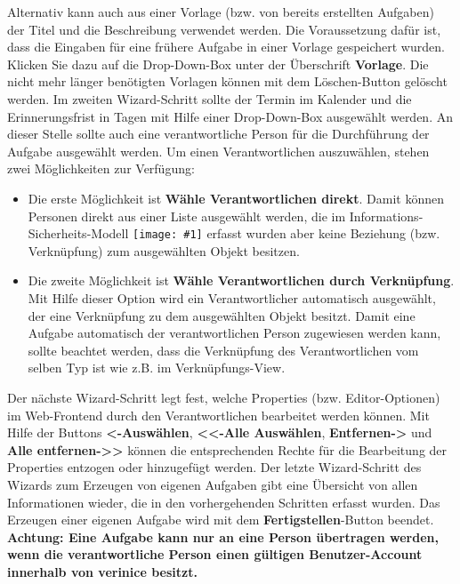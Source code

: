 \documentclass[a4paper,10pt]{book}
\newcommand{\icon}[1]{\texttt{[image: \#1]}}
\begin{document}
Alternativ kann auch aus einer Vorlage (bzw. von bereits erstellten Aufgaben) der Titel und die
Beschreibung verwendet werden. Die Voraussetzung dafür ist, dass die Eingaben für eine frühere Aufgabe in einer Vorlage gespeichert wurden.
Klicken Sie dazu auf die Drop-Down-Box unter der Überschrift \textbf{Vorlage}.
Die nicht mehr länger benötigten Vorlagen können mit dem Löschen-Button gelöscht werden.
Im zweiten Wizard-Schritt sollte der Termin im Kalender und die Erinnerungsfrist in Tagen mit Hilfe einer Drop-Down-Box ausgewählt werden.
An dieser Stelle sollte auch eine verantwortliche Person
für die Durchführung der Aufgabe ausgewählt werden. Um einen Verantwortlichen auszuwählen, stehen zwei Möglichkeiten zur Verfügung:
\begin{itemize}
 \item Die erste Möglichkeit ist \textbf{Wähle Verantwortlichen direkt}. Damit können Personen direkt aus einer Liste ausgewählt werden,
die im Informations-Sicherheits-Modell \icon{Icon/Informationssicherheitsmodell.png} erfasst wurden aber
keine Beziehung (bzw. Verknüpfung) zum ausgewählten Objekt besitzen.
  \item Die zweite Möglichkeit ist \textbf{Wähle Verantwortlichen durch Verknüpfung}. Mit Hilfe dieser Option wird ein Verantwortlicher automatisch
ausgewählt, der eine Verknüpfung zu dem ausgewählten Objekt besitzt. Damit eine Aufgabe automatisch der verantwortlichen Person zugewiesen werden kann, sollte
beachtet werden, dass die Verknüpfung des Verantwortlichen vom selben Typ ist wie z.B. im Verknüpfungs-View.
\end{itemize}
Der nächste Wizard-Schritt legt fest, welche Properties (bzw. Editor-Optionen) im Web-Frontend durch den Verantwortlichen bearbeitet werden können. Mit Hilfe
der Buttons \textbf{\textless-Auswählen}, \textbf{\textless\textless-Alle Auswählen}, \textbf{Entfernen-\textgreater} und \textbf{Alle entfernen-\textgreater\textgreater} können die entsprechenden
Rechte für die Bearbeitung der Properties entzogen oder hinzugefügt werden.
Der letzte Wizard-Schritt des Wizards zum Erzeugen von eigenen Aufgaben gibt eine Übersicht von allen Informationen wieder, die in den vorhergehenden Schritten erfasst wurden.
Das Erzeugen einer eigenen Aufgabe wird mit dem \textbf{Fertigstellen}-Button beendet.
\newline\\
\textbf{Achtung: Eine Aufgabe kann nur an eine Person übertragen werden, wenn die verantwortliche Person einen gültigen Benutzer-Account innerhalb von verinice besitzt.}
\end{document}
